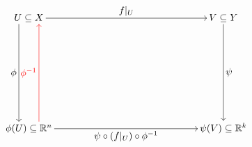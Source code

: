 \documentclass{article}
\begin{document}
\[
\begin{tikzcd}[
    row sep=3.5cm,
    column sep=5.2cm,
    cells={nodes={inner sep=2pt}},
    every label/.append style={font=\normalsize}
]
U \subseteq X
    \arrow[r, "{f|_U}"]
    \arrow[d, "\phi"', shift right=2.4ex]
&
V \subseteq Y
    \arrow[d, "\psi"]
\\
\phi(U) \subseteq \mathbb{R}^n
    \arrow[u, red, "{\phi^{-1}}", shift right=2.4ex]
    \arrow[r, "{\psi \circ (f|_U) \circ \phi^{-1}}"']
&
\psi(V) \subseteq \mathbb{R}^k
\end{tikzcd}
\]
\end{document}
